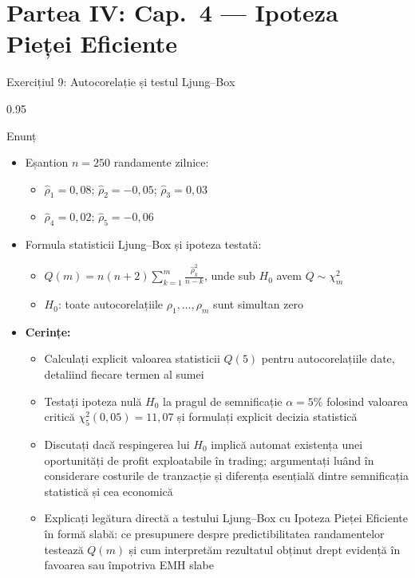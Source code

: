\documentclass[9pt, aspectratio=169, t]{beamer}
\begin{document}
\section{Partea IV: Cap.~4 --- Ipoteza Pieței Eficiente}

\begin{frame}[shrink=25]{Exercițiul 9: Autocorelație și testul Ljung--Box}
\begin{cminipage}{0.95\textwidth}
\begin{block}{Enunț}
\begin{itemize}\setlength{\itemsep}{0pt}
    \item Eșantion $n = 250$ randamente zilnice:
    \begin{itemize}\setlength{\itemsep}{0pt}
        \item $\hat\rho_1 = 0{,}08$; $\hat\rho_2 = -0{,}05$; $\hat\rho_3 = 0{,}03$
        \item $\hat\rho_4 = 0{,}02$; $\hat\rho_5 = -0{,}06$
    \end{itemize}
    \item Formula statisticii Ljung--Box și ipoteza testată:
    \begin{itemize}\setlength{\itemsep}{0pt}
        \item $Q(m) = n(n+2)\sum_{k=1}^{m}\frac{\hat\rho_k^2}{n-k}$, unde sub $H_0$ avem $Q \sim \chi^2_m$
        \item $H_0$: toate autocorelațiile $\rho_1, \ldots, \rho_m$ sunt simultan zero
    \end{itemize}
    \item \textbf{Cerințe:}
    \begin{itemize}\setlength{\itemsep}{0pt}
        \item Calculați explicit valoarea statisticii $Q(5)$ pentru autocorelațiile date, detaliind fiecare termen al sumei
        \item Testați ipoteza nulă $H_0$ la pragul de semnificație $\alpha = 5\%$ folosind valoarea critică $\chi^2_5(0{,}05) = 11{,}07$ și formulați explicit decizia statistică
        \item Discutați dacă respingerea lui $H_0$ implică automat existența unei oportunități de profit exploatabile în trading; argumentați luând în considerare costurile de tranzacție și diferența esențială dintre semnificația statistică și cea economică
        \item Explicați legătura directă a testului Ljung--Box cu Ipoteza Pieței Eficiente în formă slabă: ce presupunere despre predictibilitatea randamentelor testează $Q(m)$ și cum interpretăm rezultatul obținut drept evidență în favoarea sau împotriva EMH slabe
    \end{itemize}
\end{itemize}
\end{block}
\end{cminipage}
\end{frame}
\end{document}
